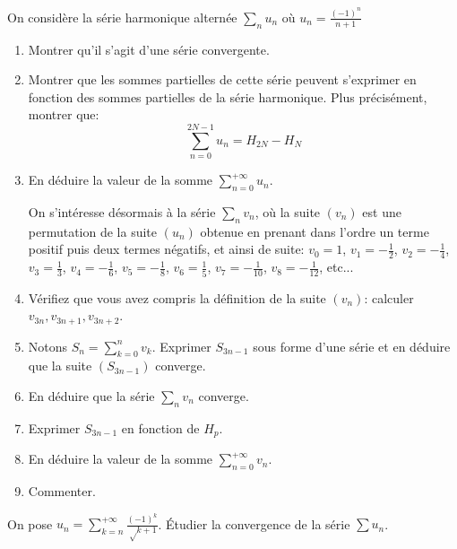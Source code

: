 \documentclass{yann}
\begin{document}
\Exercice

On considère la série harmonique alternée $∑_n u_n$ où $u_n = \frac{(-1)^n}{n+1}$
\begin{enumerate}
\item
  Montrer qu'il s'agit d'une série convergente.
\item
  Montrer que les sommes partielles de cette série peuvent s'exprimer
  en fonction des sommes partielles de la série harmonique.
  Plus précisément, montrer que:
  \[ ∑_{n = 0}^{2N-1} u_n = H_{2N} - H_N \]
\item
  En déduire la valeur de la somme $∑_{n=0}^{+∞} u_n$.

  On s'intéresse désormais à la série $∑_n v_n$,
  où la suite $(v_n)$ est une permutation de la suite $(u_n)$
  obtenue en prenant dans l'ordre un terme positif puis deux termes négatifs, et ainsi de suite:
  $v_0 = 1$, $v_1 = - \frac12$, $v_2 = -\frac14$, $v_3 = \frac13$, $v_4 = -\frac16$, $v_5 = -\frac18$,
  $v_6 = \frac15$, $v_7 = -\frac{1}{10}$, $v_8 = -\frac{1}{12}$, etc...
\item
  Vérifiez que vous avez compris la définition de la suite $(v_n)$: calculer $v_{3n}, v_{3n+1}, v_{3n+2}$.
\item
  Notons $S_n =∑_{k=0}^n v_k$.
  Exprimer $S_{3n-1}$ sous forme d'une série et en déduire que la suite $(S_{3n-1})$ converge.
\item
  En déduire que la série $∑_n v_n$ converge.
\item
  Exprimer $S_{3n-1}$ en fonction de $H_p$.
\item
  En déduire la valeur de la somme $∑_{n=0}^{+∞} v_n$.
\item
  Commenter.
\end{enumerate}

\Exercice[dur]

On pose $u_n =∑_{k=n}^{+∞} \frac{(-1)^k}{√{k+1}}$.
Étudier la convergence de la série $∑ u_n$.

\end{document}

